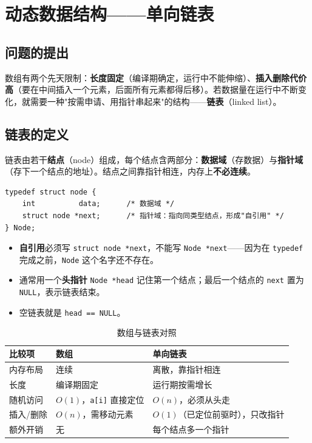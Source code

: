 \section{动态数据结构——单向链表}
\subsection{问题的提出}
数组有两个先天限制：\textbf{长度固定}（编译期确定，运行中不能伸缩）、\textbf{插入删除代价高}（要在中间插入一个元素，后面所有元素都得后移）。若数据量在运行中不断变化，就需要一种"按需申请、用指针串起来"的结构——\textbf{链表}（linked list）。

\subsection{链表的定义}
链表由若干\textbf{结点}（node）组成，每个结点含两部分：\textbf{数据域}（存数据）与\textbf{指针域}（存下一个结点的地址）。结点之间靠指针相连，内存上\textbf{不必连续}。
\begin{lstlisting}
typedef struct node {
    int          data;      /* 数据域 */
    struct node *next;      /* 指针域：指向同类型结点，形成"自引用" */
} Node;
\end{lstlisting}
\begin{itemize}
  \item \textbf{自引用}必须写 \texttt{struct node *next}，不能写 \texttt{Node *next}——因为在 \texttt{typedef} 完成之前，\texttt{Node} 这个名字还不存在。
  \item 通常用一个\textbf{头指针} \texttt{Node *head} 记住第一个结点；最后一个结点的 \texttt{next} 置为 \texttt{NULL}，表示链表结束。
  \item 空链表就是 \texttt{head == NULL}。
\end{itemize}

\begin{table}[htbp]
\centering
\caption{数组与链表对照}
\footnotesize
\begin{tabularx}{\textwidth}{@{}p{2.4cm}p{4.0cm}X@{}}
\toprule
比较项 & 数组 & 单向链表 \\
\midrule
内存布局 & 连续 & 离散，靠指针相连 \\
长度 & 编译期固定 & 运行期按需增长 \\
随机访问 & $O(1)$，\texttt{a[i]} 直接定位 & $O(n)$，必须从头走 \\
插入/删除 & $O(n)$，需移动元素 & $O(1)$（已定位前驱时），只改指针 \\
额外开销 & 无 & 每个结点多一个指针 \\
\bottomrule
\end{tabularx}
\end{table}

